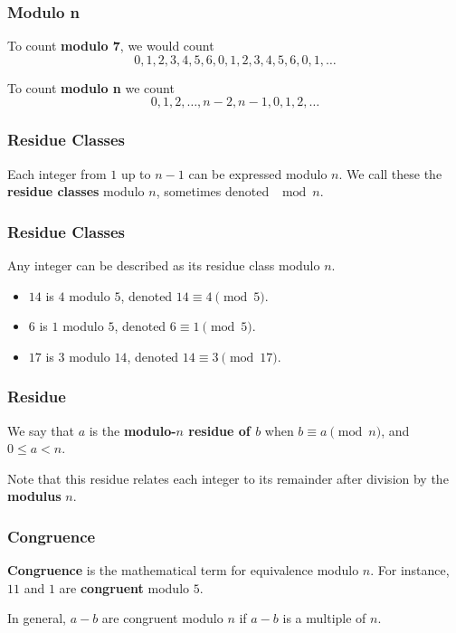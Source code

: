 \documentclass{beamer}
\newcommand{\<}{\langle}
\renewcommand{\>}{\rangle}
\begin{document}
\begin{frame}
\frametitle{Modulo n}

To count \textbf{modulo 7}, we would count
\[
0, 1, 2, 3, 4, 5, 6, 0, 1, 2, 3, 4, 5, 6, 0, 1, \dots
\]

To count \textbf{modulo n} we count
\[
0, 1, 2, \dots, n-2, n-1, 0, 1, 2, \dots
\]
\end{frame}

\begin{frame}
\frametitle{Residue Classes}

Each integer from $1$ up to $n-1$ can be expressed modulo $n$. We call these the \textbf{residue classes} modulo $n$, sometimes denoted $\mod n$.
\end{frame}

\begin{frame}
\frametitle{Residue Classes}

Any integer can be described as its residue class modulo $n$.

\begin{itemize}
\item $14$ is $4$ modulo $5$, denoted $14 \equiv 4 \pmod 5$.
\item $6$ is $1$ modulo $5$, denoted $6 \equiv 1 \pmod 5$.
\item $17$ is $3$ modulo $14$, denoted $14 \equiv 3 \pmod{17}$. 
\end{itemize}
\end{frame}

\begin{frame}
\frametitle{Residue}

We say that $a$ is the \textbf{modulo-$n$ residue of $b$} when $b \equiv a \pmod n$, and $0\le a < n$.\newline

Note that this residue relates each integer to its remainder after division by the \textbf{modulus} $n$.
\end{frame}




\begin{frame}
\frametitle{Congruence}

\textbf{Congruence} is the mathematical term for equivalence modulo $n$. For instance, $11$ and $1$ are \textbf{congruent} modulo $5$.\newline

In general, $a-b$ are congruent  modulo $n$ if $a-b$ is a multiple of $n$. 
\end{frame}
\end{document}
